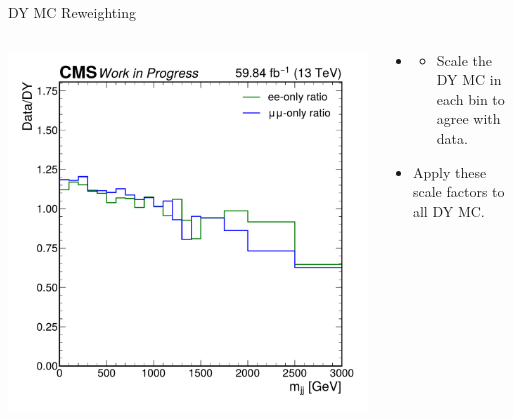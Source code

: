 \documentclass[aspectratio=169]{beamer}
\begin{document}
\begin{frame}{DY MC Reweighting}
  \begin{columns}
    \begin{column}{0.50\textwidth}
      \centering
      \includegraphics[width=\textwidth]{../figures/analysis/mass_sf_ratio.pdf}
    \end{column}
    \begin{column}{0.50\textwidth}
        \centering
        \resizebox{0.55\columnwidth}{!}{%
        
        }
        \vfill
      \begin{block}{}
        \begin{itemize}
          \item {}
          \begin{itemize}
            \item Scale the DY MC in each bin to agree with data. 
          \end{itemize}
          \item Apply these scale factors to all DY MC.
        \end{itemize}
        
      \end{block}
    \end{column}
  \end{columns}
\end{frame}
\end{document}
